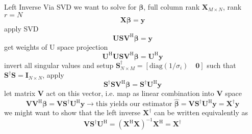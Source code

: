 \documentclass[mathserif, aspectratio=43]{intbeamer}
\begin{document}
\begin{frame}{Left Inverse Via SVD}
we want to solve for ${\bm{\beta}}$, full column rank $\bm{X}_{M \times N}$, rank $r=N$
$$\bm{X} {\bm{\beta}} = \bm{y}$$
apply SVD
$$\bm{U} \bm{S} \bm{V}^\mathrm{H} {\bm{\beta}} = \bm{y}$$
get weights of U space projection
$$\bm{U}^\mathrm{H} \bm{U} \bm{S} \bm{V}^\mathrm{H} {\bm{\beta}} = \bm{U}^\mathrm{H}\bm{y}$$
invert all singular values and setup $\bm{S}^\dagger_{N \times M} = [\mathrm{diag}(1/\sigma_i) \quad \bm{0}]$ such that
$\bm{S}^\dagger\bm{S} = \bm{I}_{N \times N}$, apply
$$\bm{S}^\dagger\bm{S} \bm{V}^\mathrm{H} {\bm{\beta}} = \bm{S}^\dagger\bm{U}^\mathrm{H}\bm{y}$$
let matrix $\bm{V}$ act on this vector, i.e. map as linear combination into $\bm{V}$ space
$$\bm{V} \bm{V}^\mathrm{H} {\bm{\beta}} = \bm{V} \bm{S}^\dagger\bm{U}^\mathrm{H}\bm{y}
\rightarrow \text{this yields our estimator } \hat{\bm{\beta}} = \bm{V} \bm{S}^\dagger\bm{U}^\mathrm{H}\bm{y} = \bm{X}^\dagger \bm{y}$$
we might want to show that the left inverse $\bm{X}^\dagger$ can be written equivalently as
$$\bm{V} \bm{S}^\dagger\bm{U}^\mathrm{H} = (\bm{X}^\mathrm{H}\bm{X})^{-1} \bm{X}^\mathrm{H} = \bm{X}^\dagger$$
\end{frame}
\end{document}
